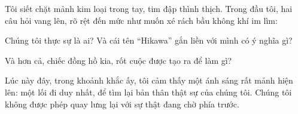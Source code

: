 \documentclass[../main.tex]{subfiles}
\begin{document}
Tôi siết chặt mảnh kim loại trong tay, tim đập thình thịch. Trong đầu tôi, hai câu hỏi vang lên, rõ rệt đến mức như muốn xé rách bầu không khí im lìm:

Chúng tôi thực sự là ai? Và cái tên ``Hikawa'' gắn liền với mình có ý nghĩa gì?

Và hơn cả, chiếc đồng hồ kia, rốt cuộc được tạo ra để làm gì?

Lúc này đây, trong khoảnh khắc ấy, tôi cảm thấy một ánh sáng rất mảnh hiện lên: một lối đi duy nhất, để tìm lại bản thân thật sự của chúng tôi. Chúng tôi không được phép quay lưng lại với sự thật đang chờ phía trước.
\end{document}
